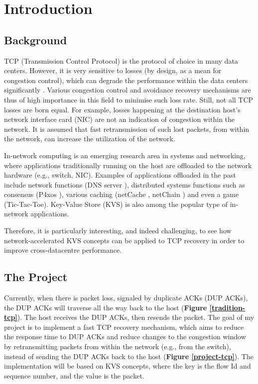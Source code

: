 \section*{\fontsize{18pt}{1}\selectfont Introduction}

\subsection*{Background}

TCP (Transmission Control Protocol) is the protocol of choice in many data centers. However, it is very sensitive to losses (by design, as a mean for congestion control), which can degrade the performance within the data centers significantly \cite{zilberman2017has}. Various congestion control and avoidance recovery mechanisms are thus of high importance in this field to minimise such loss rate. Still, not all TCP losses are born equal. For example, losses happening at the destination host's network interface card (NIC) are not an indication of congestion within the network. It is assumed that fast retransmission of such lost packets, from within the network, can increase the utilization of the network.

 In-network computing is an emerging research area in systems and networking, where applications traditionally running on the host are offloaded to the network hardware (e.g., switch, NIC). Examples of applications offloaded in the past include network functions (DNS server \cite{dns}), distributed systems functions such as consensus (P4xos \cite{p4xos}), various caching (netCache \cite{netCache}, netChain \cite{netChain}) and even a game (Tic-Tac-Toe). Key-Value Store (KVS) is also among the popular type of in-network applications. 
 
 Therefore, it is particularly interesting, and indeed challenging, to see how network-accelerated KVS concepts can be applied to TCP recovery in order to improve cross-datacentre performance.
 
 \subsection*{The Project}
 Currently, when there is packet loss, signaled by duplicate ACKs (DUP ACKs), the DUP ACKs will traverse all the way back to the host (\textbf{Figure \ref{tradition-tcp}}). The host receives the DUP ACKs, then resends the packet. The goal of my project is to implement a fast TCP recovery mechanism, which aims to reduce the response time to DUP ACKs and reduce changes to the congestion window by retransmitting packets from within the network (e.g., from the switch), instead of sending the DUP ACKs back to the host (\textbf{Figure \ref{project-tcp}}). The implementation will be based on KVS concepts, where the key is the flow Id and sequence number, and the value is the packet.
 
